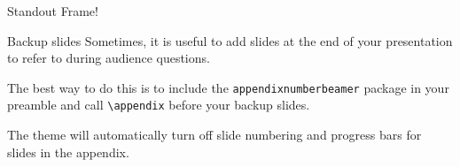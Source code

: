 \begin{frame}[standout]
	Standout Frame!
\end{frame}


\appendix
\begin{frame}[fragile]{Backup slides}
	Sometimes, it is useful to add slides at the end of your presentation to
	refer to during audience questions.
	
	The best way to do this is to include the \verb|appendixnumberbeamer|
	package in your preamble and call \verb|\appendix| before your backup slides.
	
	The theme will automatically turn off slide numbering and progress bars for
	slides in the appendix.
\end{frame}
